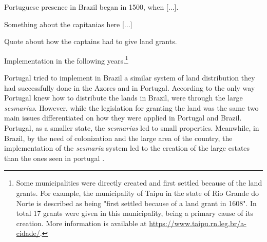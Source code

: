 \documentclass{article}
\begin{document}
Portuguese presence in Brazil began in 1500, when [...].

Something about the capitanias here [...] 

Quote about how the captains had to give land grants. 

Implementation in the following years.\footnote{Some municipalities were directly created and first settled because of the land grants. For example, the municipality of Taipu in the state of Rio Grande do Norte is described as being "first settled because of a land grant in 1608". In total 17 grants were given in this municipality, being a primary cause of its creation. More information is available at \url{https://www.taipu.rn.leg.br/a-cidade/}.}

Portugal tried to implement in Brazil a similar system of land distribution they had successfully done in the Azores and in Portugal. 
According to \textcite{Smith1944-oi} the only way Portugal knew how to distribute the lands in Brazil, were through the large \textit{sesmarias}.
However, while the legislation for granting the land was the same two main issues differentiated on how they were applied in Portugal and Brazil. 
Portugal, as a smaller state, the \textit{sesmarias} led to small properties. 
Meanwhile, in Brazil, by the need of colonization and the large area of the country, the implementation of the \textit{sesmaria} system led to the creation of the large estates than the ones seen in portugal \parencites[p.~58-59]{Da_Costa_Porto1979-dz}[p.~28]{Diffie1987-bw}[p.~23-24]{Panini1990-rj}.
\end{document}
